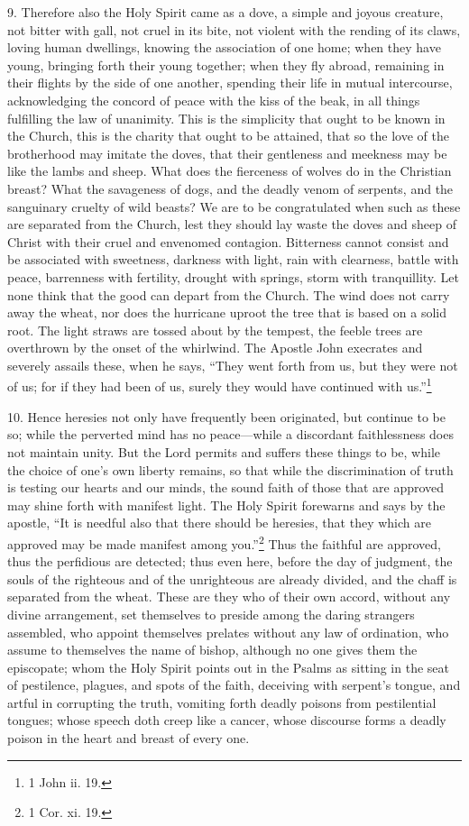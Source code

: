 9. Therefore also the Holy Spirit came as a dove, a simple and joyous creature, not bitter with gall, not cruel in its bite, not violent with the rending of its claws, loving human dwellings, knowing the association of one home; when they have young, bringing forth their young together; when they fly abroad, remaining in their flights by the side of one another, spending their life in mutual intercourse, acknowledging the concord of peace with the kiss of the beak, in all things fulfilling the law of unanimity. This is the simplicity that ought to be known in the Church, this is the charity that ought to be attained, that so the love of the brotherhood may imitate the doves, that their gentleness and meekness may be like the lambs and sheep. What does the fierceness of wolves do in the Christian breast? What the savageness of dogs, and the deadly venom of serpents, and the sanguinary cruelty of wild beasts? We are to be congratulated when such as these are separated from the Church, lest they should lay waste the doves and sheep of Christ with their cruel and envenomed contagion. Bitterness cannot consist and be associated with sweetness, darkness with light, rain with clearness, battle with peace, barrenness with fertility, drought with springs, storm with tranquillity. Let none think that the good can depart from the Church. The wind does not carry away the wheat, nor does the hurricane uproot the tree that is based on a solid root. The light straws are tossed about by the tempest, the feeble trees are overthrown by the onset of the whirlwind. The Apostle John execrates and severely assails these, when he says, “They went forth from us, but they were not of us; for if they had been of us, surely they would have continued with us.”\footnote{1 John ii. 19.}

10. Hence heresies not only have frequently been originated, but continue to be so; while the perverted mind has no peace—while a discordant faithlessness does not maintain unity. But the Lord permits and suffers these things to be, while the choice of one’s own liberty remains, so that while the discrimination of truth is testing our hearts and our minds, the sound faith of those that are approved may shine forth with manifest light. The Holy Spirit forewarns and says by the apostle, “It is needful also that there should be heresies, that they which are approved may be made manifest among you.”\footnote{1 Cor. xi. 19.} Thus the faithful are approved, thus the perfidious are detected; thus even here, before the day of judgment, the souls of the righteous and of the unrighteous are already divided, and the chaff is separated from the wheat. These are they who of their own accord, without any divine arrangement, set themselves to preside among the daring strangers assembled, who appoint themselves prelates without any law of ordination, who assume to themselves the name of bishop, although no one gives them the episcopate; whom the Holy Spirit points out in the Psalms as sitting in the seat of pestilence, plagues, and spots of the faith, deceiving with serpent’s tongue, and artful in corrupting the truth, vomiting forth deadly poisons from pestilential tongues; whose speech doth creep like a cancer, whose discourse forms a deadly poison in the heart and breast of every one.

